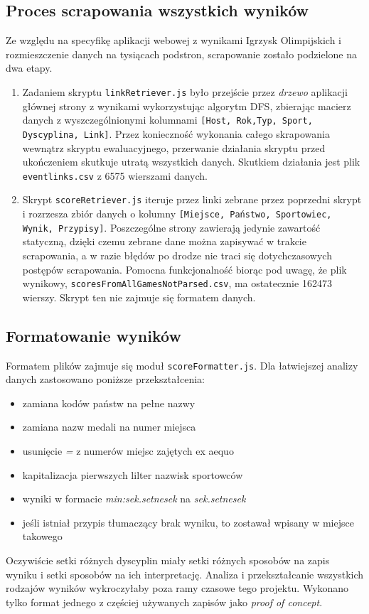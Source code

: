 \documentclass[a4paper,11pt]{article}
\begin{document}
\subsection{Proces scrapowania wszystkich wyników}
    Ze względu na specyfikę aplikacji webowej z wynikami Igrzysk Olimpijskich i 
    rozmieszczenie danych na tysiącach podstron, scrapowanie zostało podzielone
    na dwa etapy.
    \begin{enumerate}
        \item Zadaniem skryptu \verb|linkRetriever.js| było przejście przez
        \textit{drzewo} aplikacji głównej strony z wynikami wykorzystując algorytm
        DFS, zbierając macierz danych z wyszczególnionymi kolumnami
        \verb|[Host, Rok,|\newline\verb|Typ, Sport, Dyscyplina, Link]|. Przez
        konieczność wykonania całego skrapowania wewnątrz skryptu ewaluacyjnego,
        przerwanie działania skryptu przed ukończeniem skutkuje utratą wszystkich
        danych. Skutkiem działania jest plik \verb|eventlinks.csv| z 6575
        wierszami danych.
        \item Skrypt \verb|scoreRetriever.js| iteruje przez linki zebrane przez 
        poprzedni skrypt i rozrzesza zbiór danych o kolumny
        \verb|[Miejsce, Państwo, Sportowiec, Wynik, Przypisy]|. Poszczególne
        strony  zawierają jedynie zawartość statyczną, dzięki czemu zebrane dane
        można zapisywać w trakcie scrapowania, a w razie błędów po drodze nie
        traci się dotychczasowych postępów scrapowania. Pomocna funkcjonalność
        biorąc pod uwagę, że plik wynikowy, \verb|scoresFromAllGamesNotParsed.csv|,
        ma ostatecznie 162473 wierszy. Skrypt ten nie zajmuje się formatem danych. 
    \end{enumerate}
\subsection{Formatowanie wyników}
    Formatem plików zajmuje się moduł \verb|scoreFormatter.js|. Dla łatwiejszej
    analizy danych zastosowano poniższe przekształcenia:
    \begin{itemize}
        \item zamiana kodów państw na pełne nazwy
        \item zamiana nazw medali na numer miejsca
        \item usunięcie \textit{=} z numerów miejsc zajętych ex aequo
        \item kapitalizacja pierwszych lilter nazwisk sportowców
        \item wyniki w formacie \textit{min:sek.setnesek} na \textit{sek.setnesek}
        \item jeśli istniał przypis tłumaczący brak wyniku, to zostawał wpisany
              w miejsce takowego
    \end{itemize}
    Oczywiście setki różnych dyscyplin miały setki różnych sposobów na zapis
    wyniku i setki sposobów na ich interpretację. Analiza i przekształcanie 
    wszystkich rodzajów wyników wykroczyłaby poza ramy czasowe tego projektu.
    Wykonano tylko format jednego z częściej używanych zapisów jako \textit{proof
    of concept}.
\end{document}
